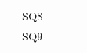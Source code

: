 \documentclass[10pt,letterpaper,oneside]{article}
\begin{document}
\begin{table}[]
\begin{tabular}{|l|l|l|p{3cm}|p{5cm}|}
		& SQ8                                   &                                    &                                                         &                                                                                                                 \\ \cline{2-2}
		& SQ9                                   &                                    &                                                         &                                                                                                                 \\ \hline
	\end{tabular}
\end{table}
\end{document}
